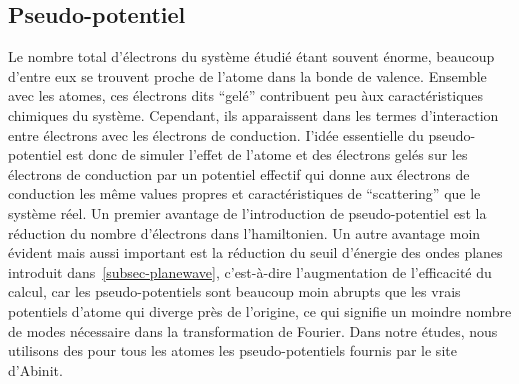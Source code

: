 \subsection{Pseudo-potentiel}
\label{subsec-pseudo}
Le nombre total d'électrons du système étudié étant souvent énorme,
beaucoup d'entre eux se trouvent proche de l'atome dans la bonde de valence.
Ensemble avec les atomes, ces électrons dits ``gelé'' contribuent peu àux caractéristiques chimiques du système.
Cependant, ils apparaissent dans les termes d'interaction entre électrons avec les électrons de conduction.
I'idée essentielle du pseudo-potentiel est donc de simuler l'effet de l'atome et des électrons gelés
sur les électrons de conduction par un potentiel effectif qui donne aux électrons de conduction
les même values propres et caractéristiques de ``scattering'' que le système réel.
Un premier avantage de l'introduction de pseudo-potentiel est la réduction du nombre d'électrons dans l'hamiltonien.
Un autre avantage moin évident mais aussi important est la réduction du seuil d'énergie des ondes planes introduit dans~\cref{subsec-planewave},
c'est-à-dire l'augmentation de l'efficacité du calcul, car les pseudo-potentiels sont beaucoup moin abrupts
que les vrais potentiels d'atome qui diverge près de l'origine,
ce qui signifie un moindre nombre de modes nécessaire dans la transformation de Fourier.
Dans notre études, nous utilisons des pour tous les atomes les pseudo-potentiels fournis par le site d'Abinit. %

